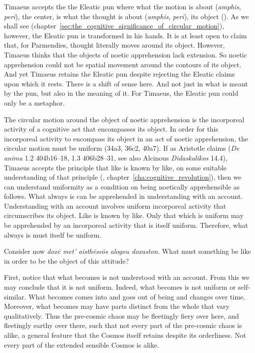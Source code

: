 Timaeus accepts the the Eleatic pun where what the motion is about (\emph{amphis}, \emph{peri}), the center, is what the thought is about (\emph{amphis}, \emph{peri}), its object (\citealt[191--3]{Mourelatos:2008ve}). As we shall see (chapter~\ref{sec:the_cognitive_significance_of_circular_motion}), however, the Eleatic pun is transformed in his hands. It is at least open to claim that, for Parmendies, thought literally moves around its object. However, Timaeus thinks that the objects of noetic apprehension lack extension. So noetic apprehension could not be spatial movement around the contours of its object. And yet Timaeus retains the Eleatic pun despite rejecting the Eleatic claims upon which it rests. There is a shift of sense here. And not just in what is meant by the pun, but also in the meaning of it. For Timaeus, the Eleatic pun could only be a metaphor.

The circular motion around the object of noetic apprehension is the incorporeal activity of a cognitive act that encompasses its object. In order for this incorporeal activity to encompass its object in an act of noetic apprehension, the circular motion must be uniform (34a3, 36c2, 40a7). If as Aristotle claims (\emph{De anima} 1.2 404b16--18, 1.3 406b28--31, see also Alcinous \emph{Didaskalikos} 14.4), Timaeus accepts the principle that like is known by like, on some suitable understanding of that principle (\citealt{Corcilius:2018bd}, chapter~\ref{cha:cognitive_revolution}), then we can understand uniformity as a condition on being noetically apprehensible as follows. What always is can be apprehended in understanding with an account. Understanding with an account involves uniform incorporeal activity that circumscribes its object. Like is known by like. Only that which is uniform may be apprehended by an incorporeal activity that is itself uniform. Therefore, what always is must itself be uniform.

Consider now \emph{doxē met’ aisthēseōs alogou doxaston}. What must something be like in order to be the object of this attitude?

First, notice that what becomes is not understood with an account. From this we may conclude that it is not uniform. Indeed, what becomes is not uniform or self-similar. What becomes comes into and goes out of being and changes over time. Moreover, what becomes may have parts distinct from the whole that vary qualitatively. Thus the pre-cosmic chaos may be fleetingly fiery over here, and fleetingly earthy over there, such that not every part of the pre-cosmic chaos is alike, a general feature that the Cosmos itself retains despite its orderliness. Not every part of the extended sensible Cosmos is alike.

